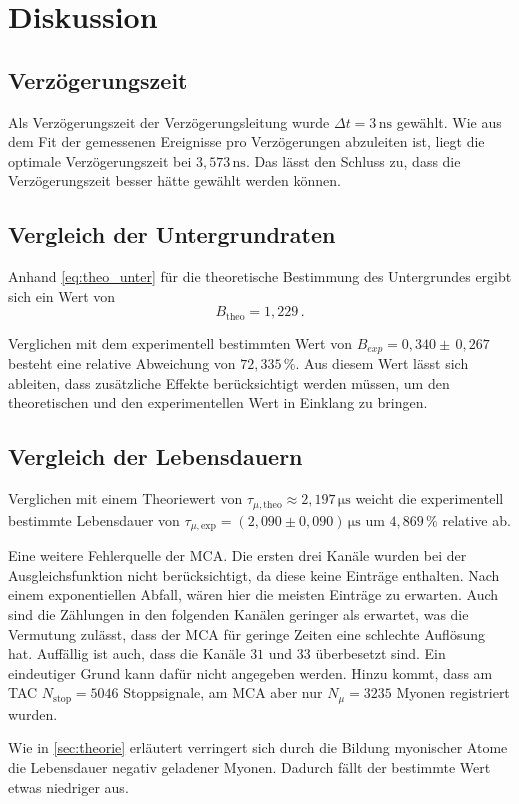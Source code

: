 \section{Diskussion}
\label{sec:Diskussion}

\subsection{Verzögerungszeit}

Als Verzögerungszeit der Verzögerungsleitung wurde $\Delta t = 3 \,\unit{\nano\second}$ gewählt.
Wie aus dem Fit der gemessenen Ereignisse pro Verzögerungen abzuleiten ist, liegt die optimale Verzögerungszeit bei
$3,573 \,\unit{\nano\second}$. Das lässt den Schluss zu, dass die Verzögerungszeit besser hätte gewählt werden können.


\subsection{Vergleich der Untergrundraten}

Anhand \eqref{eq:theo_unter} für die theoretische Bestimmung des Untergrundes ergibt sich ein Wert von
\begin{equation}
    B_\text{theo} = 1,229 \,.
\end{equation}

Verglichen mit dem experimentell bestimmten Wert von $B_{exp} = 0,340 \pm \, 0,267$ besteht eine relative Abweichung von
$72,335 \,\%$. Aus diesem Wert lässt sich ableiten, dass zusätzliche Effekte berücksichtigt werden müssen, um den theoretischen und den experimentellen Wert in Einklang zu bringen.

\subsection{Vergleich der Lebensdauern}

Verglichen mit einem Theoriewert von $\tau_{\mu,\text{theo}} \approx 2,197 \,\unit{\micro\second}$ \cite{pdg} weicht die experimentell bestimmte Lebensdauer von
$\tau_{\mu,\text{exp}} =  \left(2,090  \pm 0,090 \right) \,\unit{\micro\second}$ um $4,869 \,\%$ relative ab.

Eine weitere Fehlerquelle der MCA. Die ersten drei Kanäle wurden bei der Ausgleichsfunktion nicht berücksichtigt, da diese keine Einträge enthalten. Nach einem exponentiellen Abfall, wären hier die meisten Einträge zu erwarten. 
Auch sind die Zählungen in den folgenden Kanälen geringer als erwartet, was die Vermutung zulässt, dass der MCA für geringe Zeiten eine schlechte Auflösung hat.
Auffällig ist auch, dass die Kanäle $31$ und $33$ überbesetzt sind. Ein eindeutiger Grund kann dafür nicht angegeben werden.
Hinzu kommt, dass am TAC $N_\text{stop} = 5046$ Stoppsignale, am MCA aber nur $N_{\mu} = 3235$ Myonen registriert wurden.

Wie in \autoref{sec:theorie} erläutert verringert sich durch die Bildung myonischer Atome die Lebensdauer
negativ geladener Myonen. Dadurch fällt der bestimmte Wert etwas niedriger aus. \\

